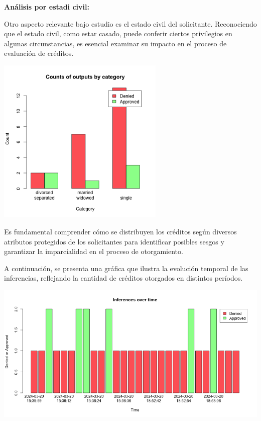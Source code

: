 \documentclass{article}
\begin{document}
\begin{multicols}{2}
\vspace{0.5cm}
\textbf{Análisis por estadi civil:}

Otro aspecto relevante bajo estudio es el estado civil del solicitante. Reconociendo que el estado civil, como estar casado, puede conferir ciertos privilegios en algunas circunstancias, es esencial examinar su impacto en el proceso de evaluación de créditos. 

\begin{center} %
    \includegraphics[width=8cm]{tex/media/marital.png} 
\end{center}

Es fundamental comprender cómo se distribuyen los créditos según diversos atributos protegidos de los solicitantes para identificar posibles sesgos y garantizar la imparcialidad en el proceso de otorgamiento.

\end{multicols}

A continuación, se presenta una gráfica que ilustra la evolución temporal de las inferencias, reflejando la cantidad de créditos otorgados en distintos períodos.

\begin{center} %
    \includegraphics[width=16cm]{tex/media/sequence.png} 
\end{center}
\end{document}

